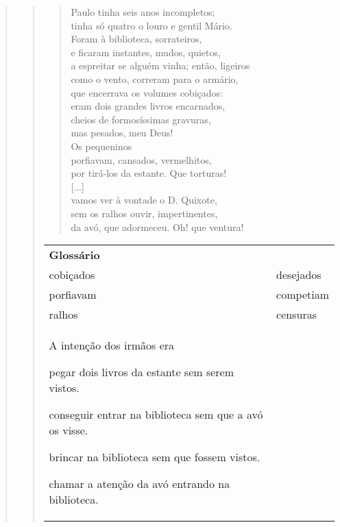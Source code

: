 \begin{escolha}
\begin{escolha}
\begin{quote}
\begin{quote}
\begin{verse}
Paulo tinha seis anos incompletos;\\
tinha só quatro o louro e gentil Mário.\\
Foram à biblioteca, sorrateiros,\\
e ficaram instantes, mudos, quietos,\\
a espreitar se alguém vinha; então, ligeiros\\
como o vento, correram para o armário,\\
que encerrava os volumes cobiçados:\\
eram dois grandes livros encarnados,\\
cheios de formosíssimas gravuras,\\
mas pesados, meu Deus!\\
Os pequeninos\\
porfiavam, cansados, vermelhitos,\\
por tirá-los da estante. Que torturas!\\
{[}...{]}\\
vamos ver à vontade o D. Quixote,\\
sem os ralhos ouvir, impertinentes,\\
da avó, que adormeceu. Oh! que ventura!
\end{verse}


\begin{tabular}{ll}
\textbf{Glossário} & \mbox{}\\
cobiçados & desejados\\
porfiavam & competiam\\
ralhos & censuras\\
\begin{end}

A intenção dos irmãos era

\begin{escolha}
\item pegar dois livros da estante sem serem vistos.

\item conseguir entrar na biblioteca sem que a avó os visse.

\item brincar na biblioteca sem que fossem vistos.

\item chamar a atenção da avó entrando na biblioteca.
\end{escolha}


\end{end}
\end{tabular}
\end{quote}
\end{quote}
\end{escolha}
\end{escolha}
